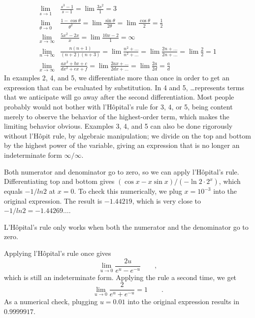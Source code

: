\begin{align*}
  \lim_{s\rightarrow 1} & \frac{s^3-1}{s-1} = \lim \frac{3s^2}{1} = 3 \\
  \lim_{\theta\rightarrow 0} & \frac{1-\cos\theta}{\theta^2} = \lim \frac{\sin\theta}{2\theta} = \lim \frac{\cos\theta}{2} = \frac{1}{2} \\
  \lim_{x\rightarrow \infty} & \frac{5x^2-2x}{x} = \lim \frac{10x-2}{1} = \infty \\
  \lim_{n\rightarrow \infty} & \frac{n(n+1)}{(n+2)(n+3)} = \lim \frac{n^2+\ldots}{n^2+\ldots}  = \lim \frac{2n+\ldots}{2n+\ldots} = \lim \frac{2}{2} = 1 \\
  \lim_{x\rightarrow \infty} & \frac{ax^2+bx+c}{dx^2+ex+f} = \lim \frac{2ax+\ldots}{2dx+\ldots} = \lim \frac{2a}{2d} = \frac{a}{d}
\end{align*}
In examples 2, 4, and 5, we differentiate more than once in order to get an expression that can be evaluated by
substitution. In 4 and 5, \ldots represents terms that we anticipate will go away after the second differentiation.
Most people probably would not bother with l'H\^{o}pital's rule for 3, 4, or 5, being content merely to observe
the behavior of the highest-order term, which makes the limiting behavior obvious. Examples 3, 4, and 5 can also
be done rigorously without l'H\^{o}pit rule, by algebraic manipulation;
we divide on the top and bottom by the highest power of the variable, giving an expression that is no longer
an indeterminate form $\infty/\infty$.


Both numerator and denominator go to zero, so we can apply l'H\^{o}pital's rule. Differentiating top and bottom gives
$(\cos x-x\sin x)/(-\ln 2 \cdot 2^x)$, which equals $-1/ln 2$ at $x=0$. To check this numerically, we plug 
$x=10^{-3}$ into the original expression. The result is $-1.44219$, which is very close to $-1/ln 2=-1.44269\ldots$.


L'H\^{o}pital's rule only works when both the numerator and the denominator go to zero.

Applying l'H\^{o}pital's rule once gives
\begin{equation*}
  \lim_{u\rightarrow 0} \frac{2u}{e^u-e^{-u}} \qquad ,
\end{equation*}
which is still an indeterminate form. Applying the rule a second time, we get
\begin{equation*}
  \lim_{u\rightarrow 0} \frac{2}{e^u+e^{-u}} = 1 \qquad .
\end{equation*}
As a numerical check, plugging $u=0.01$ into the original expression results
in $0.9999917$.

